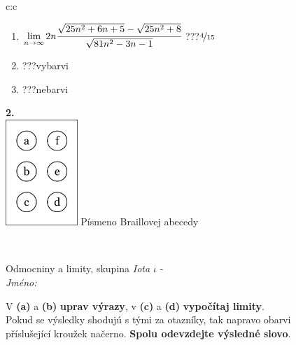 \documentclass[10pt]{report}
\begin{document}
\begin{tabular}{c:c}
\begin{minipage}[c][104.5mm][t]{0.5\linewidth}
\begin{center}
\begin{minipage}{0.79\linewidth}
\begin{center}
\begin{varwidth}{\linewidth}
\begin{enumerate}
\item $\lim\limits_{n\to\infty}2n\cfrac{\sqrt{25n^2+6n+5}-\sqrt{25n^2+8}}{\sqrt{81n^2-3n-1}}$\quad \dotfill\; ???\;\dotfill \quad $\nicefrac{4}{15}$
\item \quad \dotfill\; ???\;\dotfill \quad vybarvi
\item \quad \dotfill\; ???\;\dotfill \quad nebarvi
\end{enumerate}
\end{varwidth}
\end{center}
\end{minipage}
\begin{minipage}{0.20\linewidth}
\begin{center}
{\Huge\bfseries 2.} \\[2mm]
\includegraphics[height=40mm]{../images/braille.png}
{\small Písmeno Braillovej abecedy}
\end{center}
\end{minipage}
\end{center}
\end{minipage}
\\ \hdashline
\begin{minipage}[c][104.5mm][t]{0.5\linewidth}
\begin{center}
\vspace{7mm}
{\huge Odmocniny a limity, skupina \textit{Iota $\iota$} -}\\[5mm]
\textit{Jméno:}\phantom{xxxxxxxxxxxxxxxxxxxxxxxxxxxxxxxxxxxxxxxxxxxxxxxxxxxxxxxxxxxxxxxxx}\\[5mm]
\begin{minipage}{0.95\linewidth}
\begin{center}
V \textbf{(a)} a \textbf{(b)} \textbf{uprav výrazy}, v \textbf{(c)} a \textbf{(d)} \textbf{vypočítaj limity}.\\Pokud se výsledky shodujú s tými za otazníky, tak napravo obarvi\\příslušející kroužek načerno. \textbf{Spolu odevzdejte výsledné slovo}.
\end{center}
\end{minipage}
\\[1mm]

\end{center}
\end{minipage}
\end{tabular}
\end{document}

